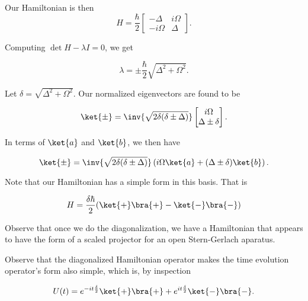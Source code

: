 Our Hamiltonian is then
\begin{equation}\label{eqn:qmIexamPractice2008Dec:2:30}
H = \frac{\hbar}{2} 
\begin{bmatrix}
-\Delta & i \Omega \\
-i \Omega & \Delta
\end{bmatrix}.
\end{equation}

Computing $\det{H - \lambda I} = 0$, we get

\begin{equation}\label{eqn:qmIexamPractice2008Dec:2:40}
\lambda = \pm \frac{\hbar}{2} \sqrt{ \Delta^2 + \Omega^2 }.
\end{equation}

Let $\delta = \sqrt{ \Delta^2 + \Omega^2 }$.  Our normalized eigenvectors are found to be

\begin{equation}\label{eqn:qmIexamPractice2008Dec:2:50}
\ket{\pm} = \inv{\sqrt{ 2 \delta (\delta \pm \Delta)} }
\begin{bmatrix}
i \Omega \\
\Delta \pm \delta
\end{bmatrix}.
\end{equation}

In terms of $\ket{a}$ and $\ket{b}$, we then have

\begin{equation}\label{eqn:qmIexamPractice2008Dec:2:60}
\ket{\pm} = \inv{\sqrt{ 2 \delta (\delta \pm \Delta)} }
\left(
i \Omega \ket{a}
+ (\Delta \pm \delta) \ket{b} \right).
\end{equation}

Note that our Hamiltonian has a simple form in this basis.  That is

\begin{equation}\label{eqn:qmIexamPractice2008Dec:2:70}
H = \frac{\delta \hbar}{2} (\ket{+}\bra{+} - \ket{-}\bra{-} )
\end{equation}

Observe that once we do the diagonalization, we have a Hamiltonian that appears to have the form of a scaled projector for an open Stern-Gerlach aparatus.

Observe that the diagonalized Hamiltonian operator makes the time evolution operator's form also simple, which is, by inspection

\begin{equation}\label{eqn:qmIexamPractice2008Dec:2:80}
U(t) = 
e^{-i t \frac{\delta}{2}} \ket{+}\bra{+} 
+ e^{i t \frac{\delta}{2}} \ket{-}\bra{-}.
\end{equation}

